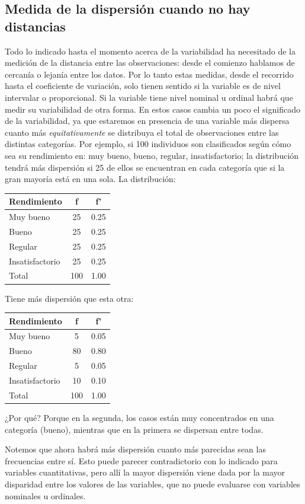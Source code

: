 \documentclass[]{book}
\begin{document}
\hypertarget{medida-de-la-dispersiuxf3n-cuando-no-hay-distancias}{%
\subsection{Medida de la dispersión cuando no hay distancias}\label{medida-de-la-dispersiuxf3n-cuando-no-hay-distancias}}

Todo lo indicado hasta el momento acerca de la variabilidad ha
necesitado de la medición de la distancia entre las observaciones: desde el comienzo hablamos de cercanía o lejanía entre los datos. Por lo tanto
estas medidas, desde el recorrido hasta el coeficiente de variación,
solo tienen sentido si la variable es de nivel intervalar o
proporcional. Si la variable tiene nivel nominal u ordinal habrá que
medir su variabilidad de otra forma. En estos casos cambia un poco el
significado de la variabilidad, ya que estaremos en presencia de una
variable más dispersa cuanto más \emph{equitativamente} se distribuya el
total de observaciones entre las distintas categorías. Por ejemplo, si 100 individuos son clasificados según cómo sea su rendimiento en: muy bueno, bueno, regular, insatisfactorio; la distribución tendrá más
dispersión si 25 de ellos se encuentran en cada categoría que si la gran
mayoría está en una sola. La distribución:

\begin{longtable}[]{@{}lcc@{}}
\toprule
Rendimiento & f & f'\tabularnewline
\midrule
\endhead
Muy bueno & 25 & 0.25\tabularnewline
Bueno & 25 & 0.25\tabularnewline
Regular & 25 & 0.25\tabularnewline
Insatisfactorio & 25 & 0.25\tabularnewline
Total & 100 & 1.00\tabularnewline
\bottomrule
\end{longtable}

Tiene más dispersión que esta otra:

\begin{longtable}[]{@{}lcc@{}}
\toprule
Rendimiento & f & f'\tabularnewline
\midrule
\endhead
Muy bueno & 5 & 0.05\tabularnewline
Bueno & 80 & 0.80\tabularnewline
Regular & 5 & 0.05\tabularnewline
Insatisfactorio & 10 & 0.10\tabularnewline
Total & 100 & 1.00\tabularnewline
\bottomrule
\end{longtable}

¿Por qué? Porque en la segunda, los casos están muy concentrados en una categoría (bueno), mientras que en la primera se dispersan entre todas.

Notemos que ahora habrá más dispersión cuanto más parecidas sean las
frecuencias entre sí. Esto puede parecer contradictorio con lo indicado
para variables cuantitativas, pero allí la mayor dispersión viene dada
por la mayor disparidad entre los valores de las variables, que no puede
evaluarse con variables nominales u ordinales.
\end{document}
